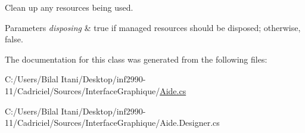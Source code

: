 Clean up any resources being used. 


\begin{DoxyParams}{Parameters}
{\em disposing} & true if managed resources should be disposed; otherwise, false.\\
\hline
\end{DoxyParams}


The documentation for this class was generated from the following files\+:\begin{DoxyCompactItemize}
\item 
C\+:/\+Users/\+Bilal Itani/\+Desktop/inf2990-\/11/\+Cadriciel/\+Sources/\+Interface\+Graphique/\hyperlink{_aide_8cs}{Aide.\+cs}\item 
C\+:/\+Users/\+Bilal Itani/\+Desktop/inf2990-\/11/\+Cadriciel/\+Sources/\+Interface\+Graphique/Aide.\+Designer.\+cs\end{DoxyCompactItemize}
